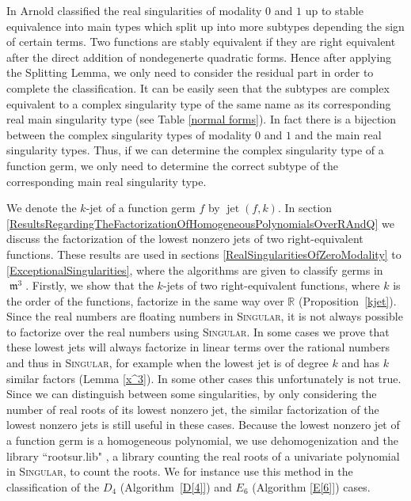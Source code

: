 \documentclass[noend]{amsproc}
\DeclareMathOperator{\m}{\mathfrak{m}}
\DeclareMathOperator{\jet}{jet}
\begin{document}
In \cite{AVG1985} Arnold classified the real singularities of modality $0$ and
$1$ up to stable equivalence into main types which split up into more subtypes
depending the sign of certain terms. Two functions are stably equivalent if
they are right equivalent after the direct addition of nondegenerte quadratic
forms. Hence after applying the Splitting Lemma,  we only need to consider the
residual part in order to complete the classification.   It can be easily seen
that the subtypes are complex equivalent to a complex singularity type of the
same name as its corresponding real main singularity type (see Table
\ref{normal forms}). In fact there is a bijection between the complex
singularity types of modality $0$ and $1$ and the main real singularity types.
Thus, if we can determine the complex singularity type of a function germ, we
only need to determine the correct subtype of the corresponding main real
singularity type.

We denote the $k$-jet of a function germ $f$ by $\jet(f,k)$. In section
\ref{ResultsRegardingTheFactorizationOfHomogeneousPolynomialsOverRAndQ} we
discuss the factorization of the lowest nonzero jets of two right-equivalent
functions. These results are used in sections
\ref{RealSingularitiesOfZeroModality} to \ref{ExceptionalSingularities}, where
the algorithms are given to classify germs in $\m^3$. Firstly, we show that the
$k$-jets of two right-equivalent functions, where $k$ is the order of the
functions, factorize in the same way over $\mathbb R$ (Proposition~\ref{kjet}).
Since
the real numbers are floating numbers in \textsc{Singular}, it is not always
possible to factorize over the real numbers using \textsc{Singular}. In some
cases we prove that these lowest jets will always factorize in linear terms
over the rational numbers and thus in \textsc{Singular}, for example when the
lowest jet is of degree $k$ and has $k$ similar factors (Lemma \ref{x^3}). In
some other cases this unfortunately is not true. Since we can distinguish
between some singularities, by only considering the number of real roots of its
lowest nonzero jet, the similar factorization of the lowest nonzero jets is
still useful in these cases. Because the lowest nonzero jet of a function germ
is a homogeneous polynomial, we use dehomogenization and the library
``rootsur.lib" \cite{roots}, a library counting the real roots of a univariate
polynomial in \textsc{Singular}, to count the roots. We for instance use this
method in the classification of the $D_4$ (Algorithm~\ref{D[4]}) and $E_6$
(Algorithm \ref{E[6]}) cases.
\end{document}
